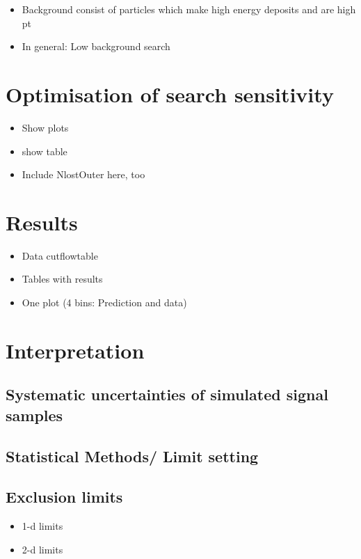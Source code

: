 \begin{itemize}
\item Background consist of particles which make high energy deposits and are high pt
\item In general: Low background search
\end{itemize}
\chapter{Optimisation of search sensitivity}
\label{sec:Optimization}
\begin{itemize}
\item Show plots
\item show table
\item Include NlostOuter here, too
\end{itemize}


\chapter{Results}
\label{sec:Results}
\begin{itemize}
\item Data cutflowtable
\item Tables with results
\item One plot (4 bins: Prediction and data)
\end{itemize}

\chapter{Interpretation}
\label{sec:Interpretation}
\section{Systematic uncertainties of simulated signal samples}
\section{Statistical Methods/ Limit setting}
\section{Exclusion limits}
\begin{itemize}
\item 1-d limits
\item 2-d limits
\end{itemize}

